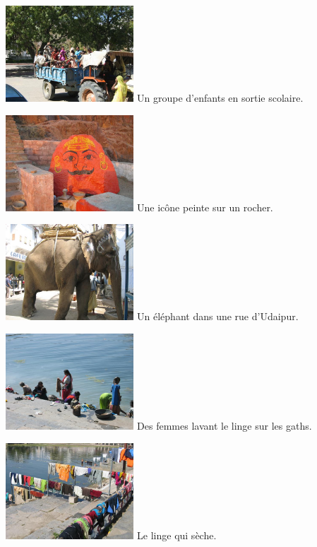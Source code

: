 \begin{multicols}{2}
\hspace*{-0.65cm}
\includegraphics[width=4.8cm]{articles/Il-commence-a-faire-chaud/scolaire.jpg}
Un groupe d'enfants en sortie scolaire.

\hspace*{-0.65cm}
\includegraphics[width=4.8cm]{articles/Il-commence-a-faire-chaud/bonhommerouge.jpg}
Une icône peinte sur un rocher.

\hspace*{-0.65cm}
\includegraphics[width=4.8cm]{articles/Il-commence-a-faire-chaud/elephant.jpg}
Un éléphant dans une rue d'Udaipur.

\hspace*{-0.65cm}
\includegraphics[width=4.8cm]{articles/Il-commence-a-faire-chaud/linge.jpg}
Des femmes lavant le linge sur les gaths.

\hspace*{-0.65cm}
\includegraphics[width=4.8cm]{articles/Il-commence-a-faire-chaud/seche.jpg}
Le linge qui sèche.


\end{multicols}
